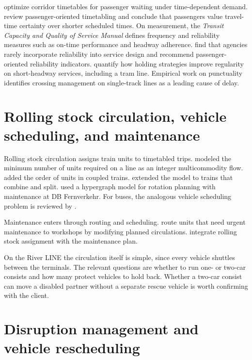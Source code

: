 \documentclass[11pt]{article}
\begin{document}
\citet{niu2015train} optimize corridor timetables for passenger waiting under time-dependent demand. \citet{parbo2016passenger} review passenger-oriented timetabling and conclude that passengers value travel-time certainty over shorter scheduled times. On measurement, the \emph{Transit Capacity and Quality of Service Manual} \citep{tcrp2013tcqsm} defines frequency and reliability measures such as on-time performance and headway adherence. \citet{vanoort2014incorporating} find that agencies rarely incorporate reliability into service design and recommend passenger-oriented reliability indicators. \citet{vanoort2010reliability} quantify how holding strategies improve regularity on short-headway services, including a tram line. Empirical work on punctuality \citep{olsson2004influencing} identifies crossing management on single-track lines as a leading cause of delay.

\section{Rolling stock circulation, vehicle scheduling, and maintenance}

Rolling stock circulation assigns train units to timetabled trips. \citet{schrijver1993minimum} modeled the minimum number of units required on a line as an integer multicommodity flow. \citet{alfieri2006efficient} added the order of units in coupled trains. \citet{fioole2006rolling} extended the model to trains that combine and split. \citet{borndorfer2016integrated} used a hypergraph model for rotation planning with maintenance at DB Fernverkehr. For buses, the analogous vehicle scheduling problem is reviewed by \citet{bunte2009overview}.

Maintenance enters through routing and scheduling. \citet{maroti2005maintenance,maroti2007maintenance} route units that need urgent maintenance to workshops by modifying planned circulations. \citet{lai2015optimizing} integrate rolling stock assignment with the maintenance plan.

On the River LINE the circulation itself is simple, since every vehicle shuttles between the terminals. The relevant questions are whether to run one- or two-car consists and how many protect vehicles to hold back. Whether a two-car consist can move a disabled partner without a separate rescue vehicle is worth confirming with the client.

\section{Disruption management and vehicle rescheduling}
\end{document}
